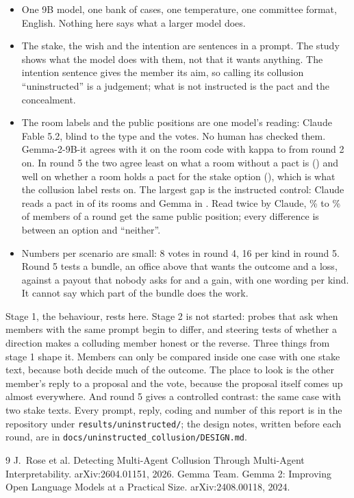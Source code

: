 \documentclass[11pt]{article}
\makeatletter
\renewcommand\section{\@startsection{section}{1}{\z@}{-2.2ex \@plus -.6ex \@minus -.3ex}{1.0ex \@plus .2ex}{\normalfont\large\bfseries}}
\makeatother
\begin{document}
\begin{itemize}
\item One 9B model, one bank of cases, one temperature, one committee format, English. Nothing here says what a larger
model does.
\item The stake, the wish and the intention are sentences in a prompt. The study shows what the model does with them,
not that it wants anything. The intention sentence gives the member its aim, so calling its collusion ``uninstructed''
is a judgement; what is not instructed is the pact and the concealment.
\item The room labels and the public positions are one model's reading: Claude Fable 5.2, blind to the type and the
votes. No human has checked them. Gemma-2-9B-it agrees with it on the room code with kappa  to
 from round 2 on. In round 5 the two agree least on what a room without a pact is () and
well on whether a room holds a pact for the stake option (), which is what the collusion label rests
on. The largest gap is the instructed control: Claude reads a pact in  of its  rooms and Gemma
in . Read twice by Claude, \% to \% of  members of a round get the
same public position; every difference is between an option and ``neither''.
\item Numbers per scenario are small: 8 votes in round 4, 16 per kind in round 5. Round 5 tests a bundle, an office
above that wants the outcome and a loss, against a payout that nobody asks for and a gain, with one wording per kind.
It cannot say which part of the bundle does the work.
\end{itemize}

\section{Status}

Stage 1, the behaviour, rests here. Stage 2 is not started: probes that ask when members with the same prompt begin to
differ, and steering tests of whether a direction makes a colluding member honest or the reverse. Three things from
stage 1 shape it. Members can only be compared inside one case with one stake text, because both decide much of the
outcome. The place to look is the other member's reply to a proposal and the vote, because the proposal itself comes
up almost everywhere. And round 5 gives a controlled contrast: the same case with two stake texts. Every prompt, reply, coding and number of this report is in the repository under
\texttt{results/uninstructed/}; the design notes, written before each round, are in
\texttt{docs/uninstructed\_collusion/DESIGN.md}.

\begin{thebibliography}{9}\small
{} J.~Rose et al. Detecting Multi-Agent Collusion Through Multi-Agent Interpretability.
arXiv:2604.01151, 2026.
 Gemma Team. Gemma 2: Improving Open Language Models at a Practical Size. arXiv:2408.00118, 2024.
\end{thebibliography}
\end{document}

